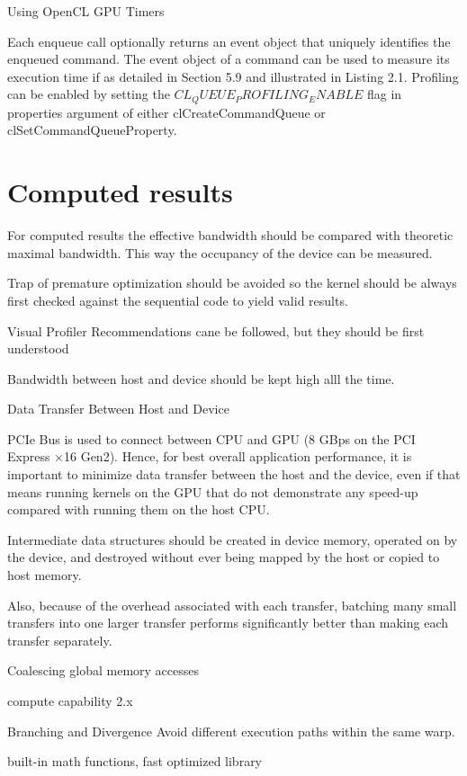 Using OpenCL GPU Timers

Each enqueue call optionally returns an event object that uniquely identifies the enqueued command. The event object of a command can be used to measure its execution time if as detailed in Section 5.9 and illustrated in Listing 2.1. Profiling can be enabled by setting the $CL_QUEUE_PROFILING_ENABLE$ flag in properties argument of either clCreateCommandQueue or clSetCommandQueueProperty.\cite{nvidia2009openclbest}


\section{Computed results}
For computed results the effective bandwidth should be compared with theoretic maximal bandwidth. This way the occupancy of the device can be measured.

Trap of premature optimization should be avoided so the kernel should be always first checked against the sequential code to yield valid results.

Visual Profiler Recommendations cane be followed, but they should be first understood

Bandwidth between host and device should be kept high alll the time.

Data Transfer Between Host and Device

PCIe Bus is used to connect between CPU and GPU 
(8 GBps on the PCI Express ×16 Gen2).
Hence, for best overall application performance, it is important to minimize data
transfer between the host and the device, even if that means running kernels on the
GPU that do not demonstrate any speed-up compared with running them on the
host CPU.


Intermediate data structures should be created in device memory, operated on by
the device, and destroyed without ever being mapped by the host or copied to host
memory.\cite{nvidia2009openclbest}

Also, because of the overhead associated with each transfer, batching many small
transfers into one larger transfer performs significantly better than making each
transfer separately.\cite{nvidia2009openclbest}



Coalescing global memory accesses

compute capability 2.x

Branching and Divergence
Avoid different execution paths within the same warp.


built-in math functions, fast optimized library

